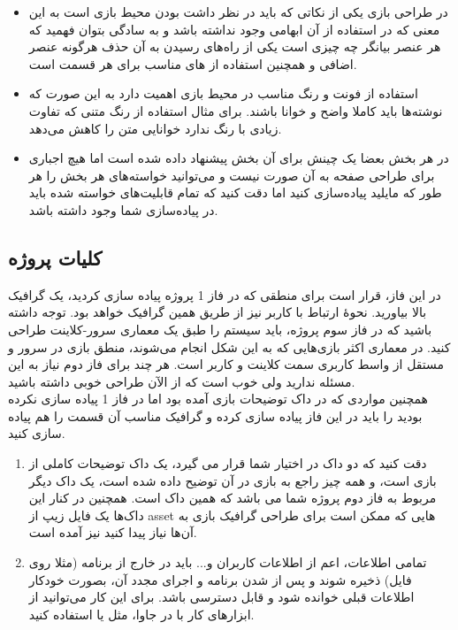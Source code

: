 \documentclass[]{article}
\begin{document}

\begin{itemize}

 \item در طراحی بازی یکی از نکاتی که باید در نظر داشت  بودن محیط بازی است به این معنی که در استفاده از آن ابهامی وجود نداشته باشد و به سادگی بتوان فهمید که هر عنصر بیانگر چه چیزی است یکی از را‌ه‌های رسیدن به آن حذف هرگونه عنصر اضافی و همچنین استفاده از  های مناسب برای هر قسمت است.
 
 \item استفاده از فونت و رنگ مناسب در محیط بازی اهمیت دارد به این صورت که نوشته‌ها باید کاملا واضح و خوانا باشند. برای مثال استفاده از رنگ متنی که تفاوت زیادی با رنگ  ندارد خوانایی متن را کاهش می‌دهد.
\item در هر بخش بعضا یک چینش برای آن بخش پیشنهاد داده شده است اما هیچ اجباری برای طراحی صفحه به آن صورت نیست و می‌توانید خواسته‌های هر بخش را هر طور که مایلید پیاده‌سازی کنید اما دقت کنید که تمام قابلیت‌های خواسته شده باید در پیا‌ده‌سازی شما وجود داشته باشد.
\end{itemize}

\subsection*{{\titr کلیات پروژه}}

در این فاز، قرار است برای منطقی که در فاز 1 پروژه پیاده سازی کردید، یک گرافیک بالا بیاورید. نحوهٔ ارتباط با کاربر نیز از طریق همین گرافیک خواهد بود. توجه داشته باشید که در فاز سوم پروژه، باید سیستم را طبق یک معماری سرور-کلاینت طراحی کنید. در معماری اکثر بازی‌هایی که به این شکل انجام می‌شوند، منطق بازی در سرور و مستقل از واسط کاربری سمت کلاینت و کاربر است. هر چند برای فاز دوم نیاز به این مسئله ندارید ولی خوب‌ است که از الآن طراحی خوبی داشته باشید.
\\
همچنین مواردی که در داک توضیحات بازی آمده بود اما در فاز 1 پیاده سازی نکرده بودید را باید در این فاز پیاده سازی کرده و گرافیک مناسب آن قسمت را هم پیاده سازی کنید.
\begin{enumerate}[label={نکته \arabic*:}]
	\item
دقت کنید که دو داک در اختیار شما قرار می گیرد، یک داک توضیحات کاملی از بازی است، و همه چیز راجع به بازی در آن توضیح داده شده است، یک داک دیگر مربوط به فاز دوم پروژه شما می باشد که همین داک است. همچنین در کنار این داک‌ها یک فایل زیپ از asset هایی که ممکن است برای طراحی گرافیک بازی به آن‌ها نیاز پیدا کنید نیز آمده است.
\item
 تمامی اطلاعات، اعم از اطلاعات کاربران و... باید در خارج از برنامه (مثلا روی فایل) ذخیره شوند و پس از  شدن برنامه و اجرای مجدد آن، بصورت خودکار اطلاعات قبلی خوانده شود و قابل دسترسی باشد. برای این کار می‌توانید از ابزارهای کار با  در جاوا، مثل
  \href{https://www.tutorialspoint.com/gson/gson_quick_guide.htm}{\textcolor{blue}{}}
یا
  \href{https://github.com/amogilev/yagson}{\textcolor{blue}{}}
   استفاده‌ کنید.

\end{enumerate}
\end{document}
